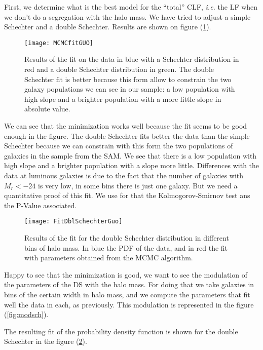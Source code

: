 First, we determine what is the best model for the ``total'' CLF, \textit{i.e.}
the LF when we don't do a segregation with the halo mass. We have tried to
adjust a simple Schechter and a double Schechter. Results are shown on figure
(\ref{fig:fitguo}).
%
\begin{figure}[ht]
    \centering
    \texttt{[image: MCMCfitGUO]}
    \caption{Results of the fit on the data in blue with a Schechter
        distribution in red and a double Schechter distribution in green. The
        double Schechter fit is better because this form allow to constrain the
        two galaxy populations we can see in our sample: a low population with
    high slope and a brighter population with a more little slope in absolute
value.}
\label{fig:fitguo}
\end{figure}
%
We can see that the minimization works well because the fit seems to be good
enough in the figure. The double Schechter fits better the data than the simple
Schechter because we can constrain with this form the two populations of
galaxies in the sample from the \citet{Guo+11} SAM\@. We see that there is a
low population with high slope and a brighter population with a slope more
little. Differences with the data at luminous galaxies is due to the fact that
the number of galaxies with $M_r<-24$ is very low, in some bins there is just
one galaxy. But we need a quantitative proof of this fit. We use for that the
Kolmogorov-Smirnov test ans the P-Value associated.
\begin{figure}[H]
    \centering
    \texttt{[image: FitDblSchechterGuo]}
    \caption{Results of the fit for the double Schechter distribution in
    different bins of halo mass. In blue the PDF of the data, and in red the
fit with parameters obtained from the MCMC algorithm.}
\label{fig:fitguodblsch}
\end{figure}

Happy to see that the minimization is good, we want to see the modulation of
the parameters of the DS with the halo mass. For doing that we take galaxies in
bins of the certain width in halo mass, and we compute the parameters that fit
well the data in each, as previously. This modulation is represented in the
figure (\ref{fig:modsch}).
%
\begin{figure*}[p]
    \centering
    \begin{minipage}{\linewidth}
    \centering
    \end{minipage}
    \begin{minipage}{\linewidth}
    \centering
    \end{minipage}
    \caption{Modulation of the parameters of both Schechter and
    double Schechter luminosity distributions with the halo mass.}
\label{fig:modsch}
\end{figure*}
%
The resulting fit of the probability density function is shown for the double
Schechter in the figure (\ref{fig:fitguodblsch}).


